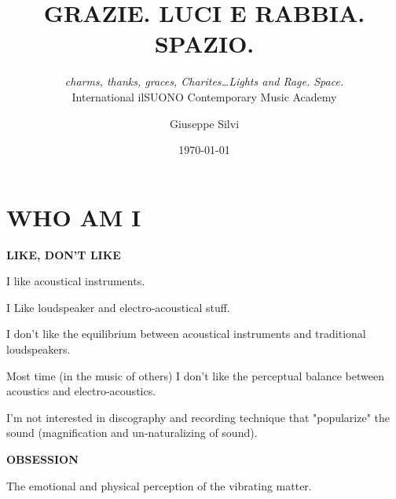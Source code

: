 \documentclass[10pt]{beamer}
\title{GRAZIE. LUCI E RABBIA. SPAZIO.}
\subtitle{\emph{charms, thanks, graces, Charites\ldots Lights and Rage. Space.} \\ \vfill International ilSUONO Contemporary Music Academy}
\date{\today}
\author{Giuseppe Silvi}
\institute{\color{mDarkBrown}{\textbf{Città di Castello}}}
\begin{document}
\maketitle




\section{WHO AM I} 

{%

\begin{frame}[fragile]{\textbf{LIKE, DON'T LIKE}}

I like acoustical instruments.

I Like loudspeaker and electro-acoustical stuff.

I don't like the equilibrium between acoustical instruments and traditional loudspeakers.

Most time (in the music of others) I don't like the perceptual balance between acoustics and electro-acoustics.

I'm not interested in discography and recording technique that "popularize" the sound (magnification and un-naturalizing of sound).

\end{frame}
}


{%

\begin{frame}[fragile]{\textbf{OBSESSION}}

The emotional and physical perception of the vibrating matter.

\end{frame}
}
\end{document}
